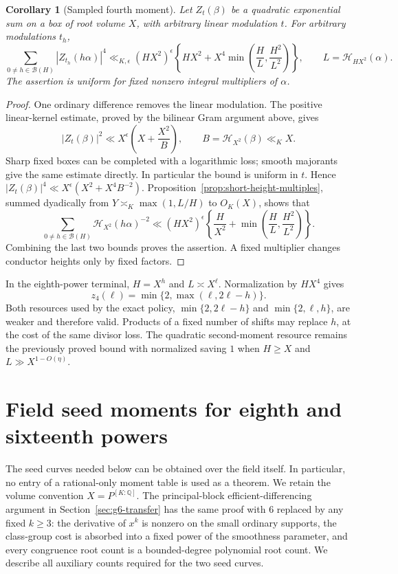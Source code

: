 \documentclass[11pt,reqno]{amsart}
\numberwithin{equation}{section}
\newtheorem{corollary}[theorem]{Corollary}
\theoremstyle{definition}
\begin{document}
\begin{corollary}[Sampled fourth moment]
\label{cor:quadratic-fourth-field}
Let $Z_t(\beta)$ be a quadratic exponential sum on a box of root volume
$X$, with arbitrary linear modulation $t$. For arbitrary modulations $t_h$,
\[
 \sum_{0\ne h\in\mathcal B(H)}|Z_{t_h}(h\alpha)|^4
 \ll_{K,\epsilon}(HX^2)^\epsilon
 \left\{HX^2+X^4\min\left(\frac HL,\frac{H^2}{L^2}\right)\right\},
 \qquad L=\mathcal H_{HX^2}(\alpha).
\]
The assertion is uniform for fixed nonzero integral multipliers of $\alpha$.
\end{corollary}
\begin{proof}
One ordinary difference removes the linear modulation. The positive
linear-kernel estimate, proved by the bilinear Gram argument above, gives
\[
 |Z_t(\beta)|^2\ll X^\epsilon
       \left(X+\frac{X^2}{B}\right),\qquad
 B=\mathcal H_{X^2}(\beta)\ll_K X.
\]
Sharp fixed boxes can be completed with a logarithmic loss; smooth majorants
give the same estimate directly. In particular the bound is uniform in $t$.
Hence $|Z_t(\beta)|^4\ll X^\epsilon(X^2+X^4B^{-2})$.
Proposition~\ref{prop:short-height-multiples}, summed dyadically from
$Y\asymp_K\max(1,L/H)$ to $O_K(X)$, shows that
\[
 \sum_{0\ne h\in\mathcal B(H)}\mathcal H_{X^2}(h\alpha)^{-2}
 \ll (HX^2)^\epsilon
       \left\{\frac H{X^2}
        +\min\left(\frac HL,\frac{H^2}{L^2}\right)\right\}.
\]
Combining the last two bounds proves the assertion. A fixed multiplier
changes conductor heights only by fixed factors.
\end{proof}

In the eighth-power terminal, $H=X^h$ and $L\asymp X^\ell$.
Normalization by $HX^4$ gives
\[
 z_4(\ell)=\min\{2,\max(\ell,2\ell-h)\}.
\]
Both resources used by the exact policy,
$\min\{2,2\ell-h\}$ and $\min\{2,\ell,h\}$, are weaker and therefore valid.
Products of a fixed number of shifts may replace $h$, at the cost of the
same divisor loss. The quadratic second-moment resource remains the
previously proved bound with normalized saving $1$ when $H\ge X$ and
$L\gg X^{1-O(\eta)}$.




\section{Field seed moments for eighth and sixteenth powers}
\label{sec:field-seed-moments}

The seed curves needed below can be obtained over the field itself. In
particular, no entry of a rational-only moment table is used as a theorem.
We retain the volume convention $X=P^{[K:\mathbb Q]}$.
The principal-block efficient-differencing argument in Section~\ref{sec:g6-transfer}
has the same proof with $6$ replaced by any fixed $k\ge3$: the derivative of
$x^k$ is nonzero on the small ordinary supports, the class-group cost is
absorbed into a fixed power of the smoothness parameter, and every
congruence root count is a bounded-degree polynomial root count. We describe
all auxiliary counts required for the two seed curves.
\end{document}
